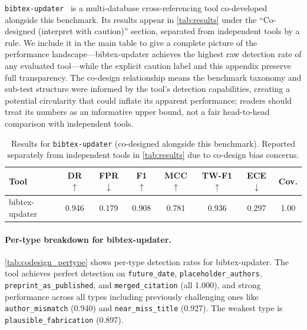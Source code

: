 \texttt{bibtex-updater}~\citep{bibtexupdater} is a multi-database cross-referencing tool co-developed alongside this benchmark.
Its results appear in \cref{tab:results} under the ``Co-designed (interpret with caution)'' section, separated from independent tools by a rule.
We include it in the main table to give a complete picture of the performance landscape---bibtex-updater achieves the highest raw detection rate of any evaluated tool---while the explicit caution label and this appendix preserve full transparency.
The co-design relationship means the benchmark taxonomy and sub-test structure were informed by the tool's detection capabilities, creating a potential circularity that could inflate its apparent performance; readers should treat its numbers as an informative upper bound, not a fair head-to-head comparison with independent tools.

\begin{table}[t]
\caption{Results for \texttt{bibtex-updater} (co-designed alongside this benchmark). Reported separately from independent tools in \cref{tab:results} due to co-design bias concerns.}
\label{tab:codesign}
\centering
\small
\begin{tabular}{lccccccc}
\toprule
\textbf{Tool} & \textbf{DR $\uparrow$} & \textbf{FPR $\downarrow$} & \textbf{F1 $\uparrow$} & \textbf{MCC $\uparrow$} & \textbf{TW-F1 $\uparrow$} & \textbf{ECE $\downarrow$} & \textbf{Cov.} \\
\midrule
bibtex-updater & 0.946 & 0.179 & 0.908 & 0.781 & 0.936 & 0.297 & 1.00 \\
\bottomrule
\end{tabular}
\end{table}

\paragraph{Per-type breakdown for bibtex-updater.}
\cref{tab:codesign_pertype} shows per-type detection rates for bibtex-updater.
The tool achieves perfect detection on \texttt{future\_date}, \texttt{placeholder\_authors}, \texttt{preprint\_as\_published}, and \texttt{merged\_citation} (all 1.000), and strong performance across all types including previously challenging ones like \texttt{author\_mismatch} (0.940) and \texttt{near\_miss\_title} (0.927). The weakest type is \texttt{plausible\_fabrication} (0.897).

